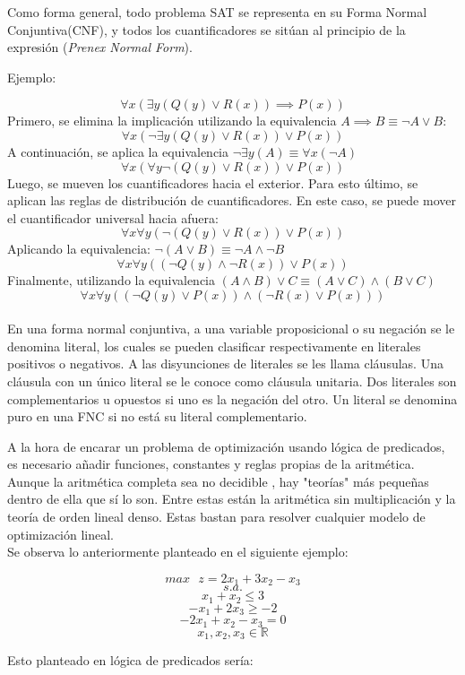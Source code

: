 \documentclass[12pt]{report}
\begin{document}
Como forma general, todo problema SAT se representa en su Forma Normal Conjuntiva(CNF), y todos los cuantificadores se sitúan al principio de la expresión (\textit{Prenex Normal Form}).

Ejemplo:

$$\forall x(\exists y(Q(y)\lor R(x))\implies P(x))$$
Primero, se elimina la implicación utilizando la equivalencia $A\implies B\equiv \neg A\lor B$:
$$\forall x(\neg\exists y(Q(y)\lor R(x)) \lor  P(x))$$
A continuación, se aplica la equivalencia $\neg\exists y(A)\equiv \forall x(\neg A)$
$$\forall x(\forall y\neg(Q(y)\lor R(x)) \lor  P(x))$$
Luego, se mueven los cuantificadores hacia el exterior. Para esto último, se aplican las reglas de distribución de cuantificadores. En este caso, se puede mover el cuantificador universal hacia afuera:
$$\forall x\forall y(\neg(Q(y)\lor R(x))\lor  P(x))$$
Aplicando la equivalencia: $\neg(A\lor B)\equiv \neg A\land\neg B$
$$\forall x\forall y((\neg Q(y)\land\neg R(x))\lor  P(x))$$
Finalmente, utilizando la equivalencia $(A\land B)\lor C\equiv (A\lor C)\land(B\lor C)$
$$\forall x\forall y((\neg Q(y)\lor  P(x))\land(\neg R(x)\lor  P(x)))$$\\

En una forma normal conjuntiva, a una variable proposicional o su negación se le denomina literal, los cuales se pueden clasificar respectivamente en literales positivos o negativos. A las disyunciones de literales se les llama cláusulas. Una cláusula con un único literal se le conoce como cláusula unitaria. Dos literales son complementarios u opuestos si uno es la negación del otro. Un literal se denomina puro en una FNC si no está su literal complementario.

A la hora de encarar un problema de optimización usando lógica de predicados, es necesario añadir funciones, constantes y reglas propias de la aritmética. Aunque la aritmética completa sea no decidible \cite{Godel}, hay "teorías" más pequeñas dentro de ella que sí lo son. Entre estas están la aritmética sin multiplicación y la teoría de orden lineal denso. Estas bastan para resolver cualquier modelo de optimización lineal.\\

Se observa lo anteriormente planteado en el siguiente ejemplo:

$$max \text{ }z= 2x_1 + 3x_2 - x_3 $$
$$s.a.$$
$$ x_1 + x_2 \leq  3 $$
$$ -x_1 + 2x_3 \geq  -2 $$
$$ -2x_1 + x_2 - x_3 = 0 $$
$$ x_1, x_2, x_3 \in \mathbb{R}  $$

Esto planteado en lógica de predicados sería:
\end{document}
